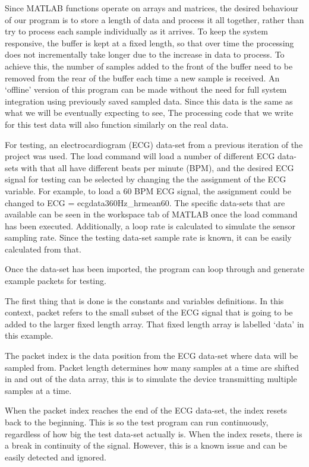 Since MATLAB functions operate on arrays and matrices,
the desired behaviour of our program is to store a length of data and process it all together,
rather than try to process each sample individually as it arrives.
To keep the system responsive, the buffer is kept at a fixed length,
so that over time the processing does not incrementally take longer due to the increase in data to process.
To achieve this, the number of samples added to the front of the buffer need to be removed from the rear of the buffer each time a new sample is received.
An `offline' version of this program can be made without the need for full system integration using previously saved sampled data.
Since this data is the same as what we will be eventually expecting to see,
The processing code that we write for this test data will also function similarly on the real data.

For testing, an electrocardiogram (ECG) data-set from a previous iteration of the project was used.
The load command will load a number of different ECG data-sets with that all have different beats per minute (BPM),
and the desired ECG signal for testing can be selected by changing the the assignment of the ECG variable.
For example, to load a 60 BPM ECG signal, the assignment could be changed to ECG = ecgdata360Hz\_hrmean60.
The specific data-sets that are available can be seen in the workspace tab of MATLAB once the load command has been executed.
Additionally, a loop rate is calculated to simulate the sensor sampling rate.
Since the testing data-set sample rate is known, it can be easily calculated from that.

Once the data-set has been imported, the program can loop through and generate example packets for testing.

The first thing that is done is the constants and variables definitions.
In this context, packet refers to the small subset of the ECG signal that is going to be added to the larger fixed length array.
That fixed length array is labelled `data' in this example.

The packet index is the data position from the ECG data-set where data will be sampled from.
Packet length determines how many samples at a time are shifted in and out of the data array,
this is to simulate the device transmitting multiple samples at a time.

When the packet index reaches the end of the ECG data-set, the index resets back to the beginning.
This is so the test program can run continuously, regardless of how big the test data-set actually is.
When the index resets, there is a break in continuity of the signal. However, this is a known issue and can be easily detected and ignored.


